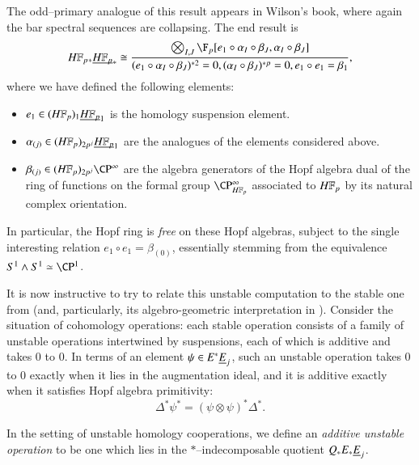 \begin{remark}
The odd--primary analogue of this result appears in Wilson's book, where again the bar spectral sequences are collapsing.  The end result is \[\HFp_* \OS{\HFp}{*} \cong \frac{\bigotimes_{I, J} \F_p[e_1 \circ \alpha_I \circ \beta_J, \alpha_I \circ \beta_J]}{(e_1 \circ \alpha_I \circ \beta_J)^{\ast 2} = 0, (\alpha_I \circ \beta_J)^{\ast p} = 0, e_1 \circ e_1 = \beta_1},\] where we have defined the following elements:
\begin{itemize}
\item $e_1 \in (\HFp)_1 \OS{\HFp}{1}$ is the homology suspension element.
\item $\alpha_{(j)} \in (\HFp)_{2p^j} \OS{\HFp}{1}$ are the analogues of the elements considered above.
\item $\beta_{(j)} \in (\HFp)_{2p^j} \CP^\infty$ are the algebra generators of the Hopf algebra dual of the ring of functions on the formal group $\CP^\infty_{\HFp}$ associated to $\HFp$ by its natural complex orientation.
\end{itemize}
In particular, the Hopf ring is \emph{free} on these Hopf algebras, subject to the single interesting relation $e_1 \circ e_1 = \beta_{(0)}$, essentially stemming from the equivalence $S^1 \sm S^1 \simeq \CP^1$.
\end{remark}

It is now instructive to try to relate this unstable computation to the stable one from  (and, particularly, its algebro-geometric interpretation in ).  Consider the situation of cohomology operations: each stable operation consists of a family of unstable operations intertwined by suspensions, each of which is additive and takes $0$ to $0$.  In terms of an element $\psi \in E^* \underline{\smash{E}}_{j}$, such an unstable operation takes $0$ to $0$ exactly when it lies in the augmentation ideal, and it is additive exactly when it satisfies Hopf algebra primitivity: \[\Delta^* \psi^* = (\psi \otimes \psi)^* \Delta^*.\]
\begin{definition}
In the setting of unstable homology cooperations, we define an \textit{additive unstable operation} to be one which lies in the $\ast$--indecomposable quotient $Q_* E_* \underline{\smash{E}}_{j}$.
\end{definition}

